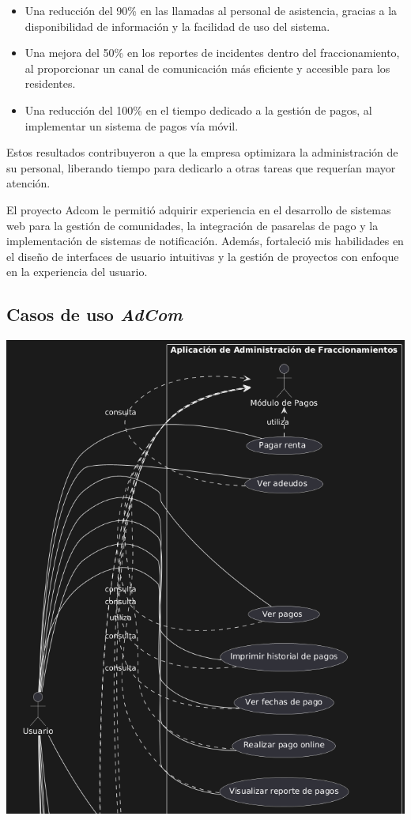 \documentclass[protocolo.tex]{subfiles}
\begin{document}
\begin{itemize}
\item Una reducción del 90\% en las llamadas al personal de asistencia,  gracias a la disponibilidad de información y la  facilidad  de  uso  del  sistema.
\item Una mejora del 50\% en los reportes de incidentes dentro del fraccionamiento,  al  proporcionar  un  canal  de  comunicación  más  eficiente  y  accesible  para  los  residentes.
\item Una reducción del 100\% en el tiempo dedicado a la gestión de pagos,  al  implementar  un  sistema  de  pagos  vía  móvil.
\end{itemize}

Estos resultados contribuyeron a que la empresa  optimizara la administración de su personal, liberando tiempo para dedicarlo a otras tareas que requerían  mayor  atención.\vspace{4mm}

El proyecto Adcom le permitió adquirir experiencia en el desarrollo de sistemas web para la gestión de comunidades,  la integración de pasarelas de pago y la  implementación  de  sistemas  de  notificación.  Además,  fortaleció  mis  habilidades  en  el  diseño  de  interfaces  de  usuario  intuitivas  y  la  gestión  de  proyectos  con  enfoque  en  la  experiencia  del  usuario.

\subsection{Casos de uso \textit{AdCom}} 
\includegraphics[scale=0.8]{Imagenes/adminfracpt1.png}
\end{document}
